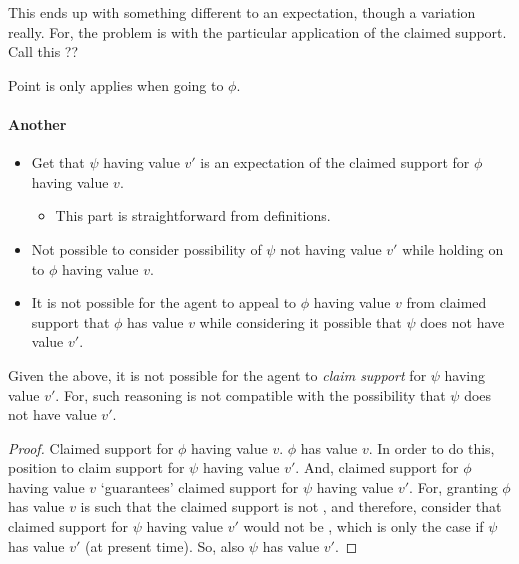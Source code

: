 \begin{note}
  This ends up with something different to an expectation, though a variation really.
  For, the problem is with the particular application of the claimed support.
  Call this ??

  Point is only applies when going to \(\phi\).
\end{note}

\paragraph{Another}

\begin{note}
  \begin{itemize}
  \item Get that \(\psi\) having value \(v'\) is an expectation of the claimed support for \(\phi\) having value \(v\).
    \begin{itemize}
    \item This part is straightforward from definitions.
    \end{itemize}
  \item Not possible to consider possibility of \(\psi\) not having value \(v'\) while holding on to \(\phi\) having value \(v\).
  \end{itemize}

  \begin{itemize}
  \item It is not possible for the agent to appeal to \(\phi\) having value \(v\) from claimed support that \(\phi\) has value \(v\) while considering it possible that \(\psi\) does not have value \(v'\).
  \end{itemize}
  Given the above, it is not possible for the agent to \emph{claim support} for \(\psi\) having value \(v'\).
  For, such reasoning is not compatible with the possibility that \(\psi\) does not have value \(v'\).

  \begin{proof}
    Claimed support for \(\phi\) having value \(v\).
    \(\phi\) has value \(v\).
    In order to do this, position to claim support for \(\psi\) having value \(v'\).
    And, claimed support for \(\phi\) having value \(v\) `guarantees' claimed support for \(\psi\) having value \(v'\).
    For, granting \(\phi\) has value \(v\) is such that the claimed support is not \misled{}, and therefore, consider that claimed support for \(\psi\) having value \(v'\) would not be \misled{}, which is only the case if \(\psi\) has value \(v'\) (at present time).
    So, also \(\psi\) has value \(v'\).


\end{proof}
\end{note}
